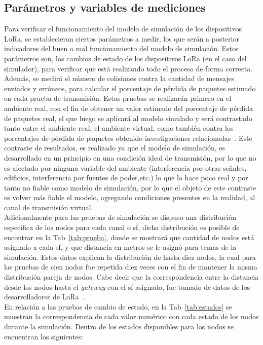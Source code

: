 \begin{justify}
\section{Parámetros y variables de mediciones}
Para verificar el funcionamiento del modelo de simulación de los dispositivos LoRa, se establecieron ciertos parámetros a medir, los que serán a posterior indicadores del buen o mal funcionamiento del modelo de simulación. Estos parámetros son, los cambios de estado de los dispositivos LoRa (en el caso del simulador), para verificar que está realizando todo el proceso de forma correcta. Además, se medirá el número de colisiones contra la cantidad de mensajes enviados y erróneos, para calcular el porcentaje de pérdida de paquetes estimado en cada prueba de transmisión. Estas pruebas se realizarán primero en el ambiente real, con el fin de obtener un valor estimado del porcentaje de pérdida de paquetes real, el que luego se aplicará al modelo simulado y será contrastado tanto entre el ambiente real, el ambiente virtual, como también contra los porcentajes de pérdida de paquetes obtenido investigaciones relacionadas~\cite{Juha}. Este contraste de resultados, es realizado ya que el modelo de simulación, es desarrollado en un principio en una condición ideal de transmisión, por lo que no es afectado por ninguna variable del ambiente (interferencia por otras señales, edificios, interferencia por fuentes de poder,etc.) lo que lo hace poco real y por tanto no fiable como modelo de simulación, por lo que el objeto de este contraste es volver más fiable el modelo, agregando condiciones presentes en la realidad, al canal de transmisión virtual.\\
Adicionalmente para las pruebas de simulación se dispuso una distribución específica de los nodos para cada canal o \gls{sf}, dicha distribución es posible de encontrar en la Tab~\ref{tab:prueba}, donde se mostrará que cantidad de nodos está asignado a cada \gls{sf}, y que distancia en metros se le asignó para temas de la simulación. Estos datos explican la distribución de hasta diez nodos, la cual para las pruebas de cien nodos fue repetida diez veces con el fin de mantener la misma distribución pareja de nodos. Cabe decir que la correspondencia entre la distancia desde los nodos hasta el \textit{gateway} con el \gls{sf} asignado, fue tomado de datos de los desarrolladores de LoRa~\cite{orange}.\\
En relación a las pruebas de cambio de estado, en la Tab~\ref{tab:estados} se muestran la correspondencia de cada valor numérico con cada estado de los nodos durante la simulación. Dentro de los estados disponibles para los nodos se encuentran los siguientes:

\end{justify}
